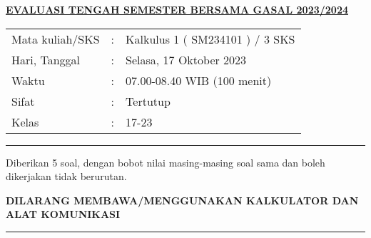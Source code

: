 \documentclass[10pt,openany,a4paper]{article}
\renewcommand{\headrulewidth}{0pt}
\begin{document}
    \newpage
    \fancyhead{}
    \fancyhead[r]{}
    \renewcommand{\headrulewidth}{0pt}
    
    \begin{center}
	{\underline{\textbf{\MakeUppercase{Evaluasi Tengah Semester Bersama Gasal 2023/2024}}}}
    \end{center}

    \begin{center}
	\begin{tabular}{lcl}
		Mata kuliah/SKS & : & Kalkulus 1 ( SM234101 ) / 3 SKS\\
		Hari, Tanggal & : & Selasa, 17 Oktober 2023\\
		Waktu & : & 07.00-08.40 WIB (100 menit)\\
		Sifat & : & Tertutup\\
		Kelas & : & 17-23
	\end{tabular}
    \end{center}
	
    \noindent\rule{\textwidth}{2.pt}
	
    \setlength{\parindent}{5pt}
    \par Diberikan 5 soal, dengan bobot nilai masing-masing soal sama dan boleh dikerjakan tidak berurutan.
    \setlength{\parindent}{5pt}
    \setlength{\parindent}{5pt}
    {\small
    \par \textbf{\MakeUppercase{Dilarang membawa/menggunakan kalkulator dan alat komunikasi}}
    }
    \par {}
	
    \noindent\rule{\textwidth}{2.pt}
	
\end{document}
